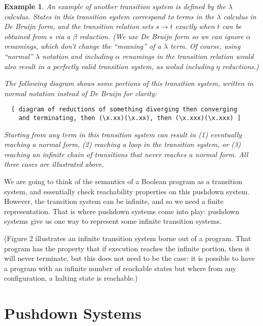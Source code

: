 \documentclass{article}
\newtheorem{example}{Example}
\begin{document}
\begin{example}
An example of another transition system is defined by the $\lambda$
calculus. States in this transition system correspond to terms in the
$\lambda$ calculus in De Bruijn form, and the transition relation sets
$s \rightarrow t$ exactly when $t$ can be obtained from $s$ via a
$\beta$ reduction. (We use De Bruijn form so we can ignore $\alpha$
renamings, which don't change the ``meaning'' of a $\lambda$ term. Of
course, using ``normal'' $\lambda$ notation and including $\alpha$
renamings in the transition relation would also result in a perfectly
valid transition system, as wolud including $\eta$ reductions.)

The following diagram shows some portions of this transition system,
written in normal notation instead of De Bruijn for clarity:

\begin{verbatim}
  [ diagram of reductions of something diverging then converging
    and terminating, then (\x.xx)(\x.xx), then (\x.xxx)(\x.xxx) ]
\end{verbatim}

Starting from any term in this transition system can result in (1)
eventually reaching a normal form, (2) reaching a loop in the
transition system, or (3) reaching an infinite chain of transitions
that never reaches a normal form. All three cases are illustrated
above.
\end{example}

We are going to think of the semantics of a Boolean program as a
transition system, and essentially check reachability properties on
this pushdown system. However, the transition system can be infinite,
and so we need a finite representation. That is where pushdown systems
come into play: pushdown systems give us one way to represent some
infinite transition systems.

(Figure 2 illustrates an infinite transition system
borne out of a program. That program has the property that if
execution reaches the infinite portion, then it will never terminate,
but this does not need to be the case: it is possible to have a
program with an infinite number of reachable states but where from any
configuration, a halting state is reachable.)


\section{Pushdown Systems}
\end{document}
